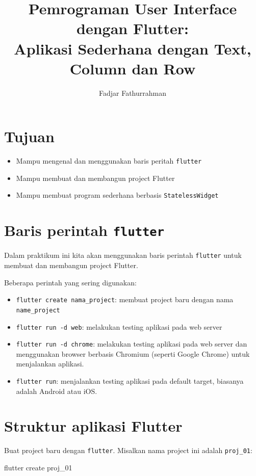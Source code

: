 \documentclass[a4paper,11pt]{article} %
\newcommand{\txtinline}[1]{\texttt{#1}}
\begin{document}
\title{Pemrograman User Interface dengan Flutter:\\
Aplikasi Sederhana dengan Text, Column dan Row}
\author{Fadjar Fathurrahman}
\date{}
\maketitle

\section{Tujuan}

\begin{itemize}
\item Mampu mengenal dan menggunakan baris peritah \txtinline{flutter}
\item Mampu membuat dan membangun project Flutter
\item Mampu membuat program sederhana berbasis \txtinline{StatelessWidget}
\end{itemize}

\section{Baris perintah \txtinline{flutter}}

Dalam praktikum ini kita akan menggunakan baris perintah \txtinline{flutter}
untuk membuat dan membangun project Flutter.

Beberapa perintah yang sering digunakan:

\begin{itemize}
\item \txtinline{flutter create nama_project}: membuat project baru dengan nama
\txtinline{name_project}
\item \txtinline{flutter run -d web}: melakukan testing aplikasi pada web server
\item \txtinline{flutter run -d chrome}: melakukan testing aplikasi pada web server
dan menggunakan browser berbasis Chromium (seperti Google Chrome) untuk
menjalankan aplikasi.
\item \txtinline{flutter run}: menjalankan testing aplikasi pada default target,
biasanya adalah Android atau iOS.
\end{itemize}

\section{Struktur aplikasi Flutter}

Buat project baru dengan \txtinline{flutter}. Misalkan nama project ini
adalah \txtinline{proj_01}:
\begin{textcode}
flutter create proj_01
\end{textcode}
\end{document}
